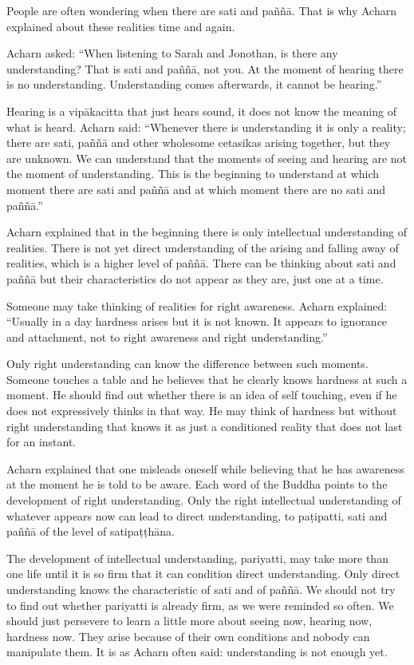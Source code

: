 People are often wondering when there are sati and paññā. That is why
Acharn explained about these realities time and again.

Acharn asked: ``When listening to Sarah and Jonothan, is there any
understanding? That is sati and paññā, not you. At the moment of hearing
there is no understanding. Understanding comes afterwards, it cannot be
hearing.''

Hearing is a vipākacitta that just hears sound, it does not know the
meaning of what is heard. Acharn said: ``Whenever there is understanding
it is only a reality; there are sati, paññā and other wholesome
cetasikas arising together, but they are unknown. We can understand that
the moments of seeing and hearing are not the moment of understanding.
This is the beginning to understand at which moment there are sati and
paññā and at which moment there are no sati and paññā.''

Acharn explained that in the beginning there is only intellectual understanding of realities. There is not yet direct understanding of the
arising and falling away of realities, which is a higher level of paññā.
There can be thinking about sati and paññā but their characteristics do
not appear as they are, just one at a time.

Someone may take thinking of realities for right awareness. Acharn
explained: ``Usually in a day hardness arises but it is not known. It
appears to ignorance and attachment, not to right awareness and right
understanding.''

Only right understanding can know the difference between such moments.
Someone touches a table and he believes that he clearly knows hardness
at such a moment. He should find out whether there is an idea of self
touching, even if he does not expressively thinks in that way. He may
think of hardness but without right understanding that knows it as just
a conditioned reality that does not last for an instant.

Acharn explained that one misleads oneself while believing that he has
awareness at the moment he is told to be aware. Each word of the Buddha
points to the development of right understanding. Only the right
intellectual understanding of whatever appears now can lead to direct
understanding, to paṭipatti, sati and paññā of the level of
satipaṭṭhāna.

The development of intellectual understanding, pariyatti, may take more
than one life until it is so firm that it can condition direct
understanding. Only direct understanding knows the characteristic of
sati and of paññā. We should not try to find out whether pariyatti is
already firm, as we were reminded so often. We should just persevere to
learn a little more about seeing now, hearing now, hardness now. They
arise because of their own conditions and nobody can manipulate them. It
is as Acharn often said: understanding is not enough yet.

